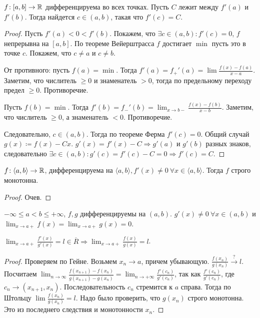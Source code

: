 \begin{theorem}
    $f\!:[a, b] \to \mathbb{R}$ дифференцируема во всех точках. Пусть  $C$ лежит между  $f'(a)$ и  $f'(b)$. Тогда найдется  $c \in (a, b)$, такая что  $f'(c) = C$.
\end{theorem}
\begin{proof}
    Пусть $f'(a) < 0 < f'(b)$. Покажем, что $\exists c \in (a, b)\!: f'(c) = 0$, $f$ непрерывна на  $[a, b]$. По теореме Вейерштрасса  $f$ достигает  $\min$ пусть это в точке $c$. Покажем, что  $c \neq a$ и  $c \neq b$. 

    От противного: пусть $f(a) = \min$. Тогда  $f'(a) = f_+'(a) = \lim \frac{f(x) - f(a)}{x-a}$. Заметим, что числитель  $\ge 0$ и знаменатель $> 0$, тогда по предельному переходу предел  $\ge 0$. Противоречие.

    Пусть $f(b) = \min$. Тогда  $f'(b) = f_-'(b) = \lim_{x \to b-} \frac{f(x) - f(b)}{x - b}$. Заметим, что  числитель  $\ge 0$, а знаменатель $<0$. Противоречие.
    
    Следовательно,  $c \in (a, b)$. Тогда по теореме Ферма  $f'(c) = 0$. Общий случай  $g(x) \coloneqq f(x) - Cx$.  $g'(x) = f'(x) - C \Rightarrow g'(a)$ и  $g'(b)$ разных знаков, следовательно  $\exists c \in (a, b)\!: g'(c) = f'(c) - C = 0 \Rightarrow f'(c) = C$.
\end{proof}
\begin{consequence}
    $f\!: \langle a, b \rangle \to \mathbb{R}$, дифференцируема на  $\langle a, b \rangle, f'(x) \neq 0\ \forall x \in \langle a, b \rangle $. Тогда  $f$ строго монотонна.
\end{consequence}
\begin{proof}
    Очев. 
\end{proof}
\begin{theorem}
    $-\infty \le a < b \le +\infty$, $f,g$ дифференцируемы на  $(a, b)$.  $g'(x) \neq 0\ \forall x \in (a, b)$ и $\lim_{x \to a+} f(x) = \lim_{x \to a+} g(x) = 0$. 

    $\lim_{x \to a+} \frac{f'(x)}{g'(x)} = l \in \overline{R} \Rightarrow \lim_{x \to a+} \frac{f(x)}{g(x)} = l$. 
\end{theorem}
\begin{proof}
    Проверяем по Гейне. Возьмем $x_n \to a$, причем убывающую.  $\frac{f(x_n)}{g(x_n)} \xrightarrow{?} l$. Посчитаем $\lim_{n \to \infty} \frac{f(x_{n+1}) - f(x_n)}{g(x_{n+1}) - g(x_n)} = \lim_{n \to +\infty} \frac{f'(c_n)}{g'(c_n)}$, так как $\frac{f'(c_n)}{g'(c_n)}$, где $c_n \to (x_{n+1}, x_n)$. Последовательность  $c_n$ стремится  к $a$ справа. Тогда по Штольцу $\lim \frac{f(x_n)}{g(x_n)} = l$. Надо было проверить, что $g(x_n)$ строго монотонна. Это из последнего следствия и монотонности $x_n$.
\end{proof}

